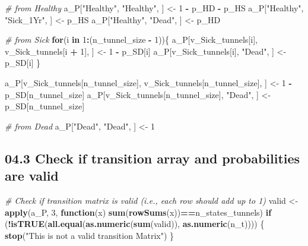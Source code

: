 \documentclass[
]{article}
\newenvironment{Shaded}{\begin{snugshade}}{\end{snugshade}}
\newcommand{\CommentTok}[1]{\textcolor[rgb]{0.56,0.35,0.01}{\textit{#1}}}
\newcommand{\ControlFlowTok}[1]{\textcolor[rgb]{0.13,0.29,0.53}{\textbf{#1}}}
\newcommand{\DecValTok}[1]{\textcolor[rgb]{0.00,0.00,0.81}{#1}}
\newcommand{\KeywordTok}[1]{\textcolor[rgb]{0.13,0.29,0.53}{\textbf{#1}}}
\newcommand{\NormalTok}[1]{#1}
\newcommand{\OperatorTok}[1]{\textcolor[rgb]{0.81,0.36,0.00}{\textbf{#1}}}
\newcommand{\StringTok}[1]{\textcolor[rgb]{0.31,0.60,0.02}{#1}}
\begin{document}
\begin{Shaded}
\begin{Highlighting}[]
\CommentTok{# from Healthy}
\NormalTok{a_P[}\StringTok{"Healthy"}\NormalTok{, }\StringTok{"Healthy"}\NormalTok{, ]  <-}\StringTok{ }\DecValTok{1} \OperatorTok{-}\StringTok{ }\NormalTok{p_HD }\OperatorTok{-}\StringTok{ }\NormalTok{p_HS}
\NormalTok{a_P[}\StringTok{"Healthy"}\NormalTok{, }\StringTok{"Sick_1Yr"}\NormalTok{, ] <-}\StringTok{ }\NormalTok{p_HS}
\NormalTok{a_P[}\StringTok{"Healthy"}\NormalTok{, }\StringTok{"Dead"}\NormalTok{, ]     <-}\StringTok{ }\NormalTok{p_HD}

\CommentTok{# from Sick}
\ControlFlowTok{for}\NormalTok{(i }\ControlFlowTok{in} \DecValTok{1}\OperatorTok{:}\NormalTok{(n_tunnel_size }\OperatorTok{-}\StringTok{ }\DecValTok{1}\NormalTok{))\{ }
\NormalTok{  a_P[v_Sick_tunnels[i], v_Sick_tunnels[i }\OperatorTok{+}\StringTok{ }\DecValTok{1}\NormalTok{], ] <-}\StringTok{ }\DecValTok{1} \OperatorTok{-}\StringTok{ }\NormalTok{p_SD[i]}
\NormalTok{  a_P[v_Sick_tunnels[i], }\StringTok{"Dead"}\NormalTok{, ] <-}\StringTok{ }\NormalTok{p_SD[i]}
\NormalTok{\}}

\NormalTok{a_P[v_Sick_tunnels[n_tunnel_size], v_Sick_tunnels[n_tunnel_size], ] <-}\StringTok{ }\DecValTok{1} \OperatorTok{-}\StringTok{ }\NormalTok{p_SD[n_tunnel_size]}
\NormalTok{a_P[v_Sick_tunnels[n_tunnel_size], }\StringTok{"Dead"}\NormalTok{, ] <-}\StringTok{ }\NormalTok{p_SD[n_tunnel_size]}

\CommentTok{# from Dead}
\NormalTok{a_P[}\StringTok{"Dead"}\NormalTok{, }\StringTok{"Dead"}\NormalTok{, ] <-}\StringTok{ }\DecValTok{1}
\end{Highlighting}
\end{Shaded}

\hypertarget{check-if-transition-array-and-probabilities-are-valid}{%
\subsection{04.3 Check if transition array and probabilities are
valid}\label{check-if-transition-array-and-probabilities-are-valid}}

\begin{Shaded}
\begin{Highlighting}[]
\CommentTok{# Check if transition matrix is valid (i.e., each row should add up to 1)}
\NormalTok{valid <-}\StringTok{ }\KeywordTok{apply}\NormalTok{(a_P, }\DecValTok{3}\NormalTok{, }\ControlFlowTok{function}\NormalTok{(x) }\KeywordTok{sum}\NormalTok{(}\KeywordTok{rowSums}\NormalTok{(x))}\OperatorTok{==}\NormalTok{n_states_tunnels)}
\ControlFlowTok{if}\NormalTok{ (}\OperatorTok{!}\KeywordTok{isTRUE}\NormalTok{(}\KeywordTok{all.equal}\NormalTok{(}\KeywordTok{as.numeric}\NormalTok{(}\KeywordTok{sum}\NormalTok{(valid)), }\KeywordTok{as.numeric}\NormalTok{(n_t)))) \{}
  \KeywordTok{stop}\NormalTok{(}\StringTok{"This is not a valid transition Matrix"}\NormalTok{)}
\NormalTok{\}}
\end{Highlighting}
\end{Shaded}
\end{document}
